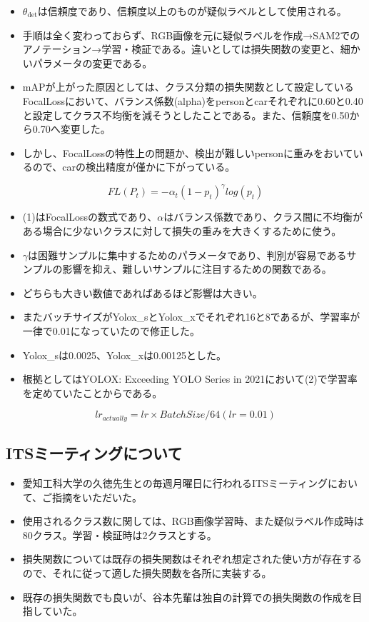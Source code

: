 \documentclass[a4j]{jarticle}
\begin{document}
	\begin{itemize}
		\item $\theta_{\mathrm{det}}$は信頼度であり、信頼度以上のものが疑似ラベルとして使用される。
		\item 手順は全く変わっておらず、RGB画像を元に疑似ラベルを作成→SAM2でのアノテーション→学習・検証である。違いとしては損失関数の変更と、細かいパラメータの変更である。
		\item mAPが上がった原因としては、クラス分類の損失関数として設定しているFocalLossにおいて、バランス係数(alpha)をpersonとcarそれぞれに0.60と0.40と設定してクラス不均衡を減そうとしたことである。また、信頼度を0.50から0.70へ変更した。
		\item しかし、FocalLossの特性上の問題か、検出が難しいpersonに重みをおいているので、carの検出精度が僅かに下がっている。
	\end{itemize}
	\begin{equation}
		FL (P_t) = - \alpha _ t(1 - p_t)^ \gamma log(p_t)
	\end{equation}
	\begin{itemize}
		\item (1)はFocalLossの数式であり、$\alpha$はバランス係数であり、クラス間に不均衡がある場合に少ないクラスに対して損失の重みを大きくするために使う。\cite{FocalLoss}
		\item $\gamma$は困難サンプルに集中するためのパラメータであり、判別が容易であるサンプルの影響を抑え、難しいサンプルに注目するための関数である。
		\item どちらも大きい数値であればあるほど影響は大きい。
	\end{itemize}
		\begin{itemize}
		\item またバッチサイズがYolox\_sとYolox\_xでそれぞれ16と8であるが、学習率が一律で0.01になっていたので修正した。
		\item Yolox\_sは0.0025、Yolox\_xは0.00125とした。
		\item 根拠としてはYOLOX: Exceeding YOLO Series in 2021において(2)で学習率を定めていたことからである。\cite{learning_rate}
	\end{itemize}
	\begin{equation}
		lr_{actually} = lr × BatchSize / 64 (lr=0.01)
	\end{equation}
	\subsection{ITSミーティングについて}
	\begin{itemize}
		\item 愛知工科大学の久徳先生との毎週月曜日に行われるITSミーティングにおいて、ご指摘をいただいた。
		\item 使用されるクラス数に関しては、RGB画像学習時、また疑似ラベル作成時は80クラス。学習・検証時は2クラスとする。
		\item 損失関数については既存の損失関数はそれぞれ想定された使い方が存在するので、それに従って適した損失関数を各所に実装する。
		\item 既存の損失関数でも良いが、谷本先輩は独自の計算での損失関数の作成を目指していた。
	\end{itemize}
\end{document}
